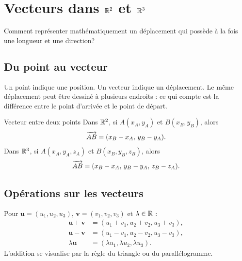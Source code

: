 \chapter{Vecteurs dans \texorpdfstring{$\mathbb{R}^2$ et $\mathbb{R}^3$}{R2 et R3}}
\label{manual:chapter:09}

\begin{questionbox}
Comment représenter mathématiquement un déplacement qui possède à la fois une longueur et une direction?
\end{questionbox}

\section{Du point au vecteur}
\label{manual:section:09.01}

\begin{intuitionbox}
Un point indique une position. Un vecteur indique un déplacement. Le même déplacement peut être dessiné à plusieurs endroits : ce qui compte est la différence entre le point d'arrivée et le point de départ.
\end{intuitionbox}

\begin{definition}{Vecteur entre deux points}{}
Dans $\mathbb{R}^2$, si $A(x_A,y_A)$ et $B(x_B,y_B)$, alors
\[
\overrightarrow{AB}=(x_B-x_A,\,y_B-y_A).
\]
Dans $\mathbb{R}^3$, si $A(x_A,y_A,z_A)$ et $B(x_B,y_B,z_B)$, alors
\[
\overrightarrow{AB}=(x_B-x_A,\,y_B-y_A,\,z_B-z_A).
\]
\end{definition}

\begin{center}
\end{center}

\section{Opérations sur les vecteurs}
\label{manual:section:09.02}

Pour $\mathbf u=(u_1,u_2,u_3)$, $\mathbf v=(v_1,v_2,v_3)$ et $\lambda\in\mathbb{R}$ :
\begin{align*}
\mathbf u+\mathbf v&=(u_1+v_1,u_2+v_2,u_3+v_3),\\
\mathbf u-\mathbf v&=(u_1-v_1,u_2-v_2,u_3-v_3),\\
\lambda\mathbf u&=(\lambda u_1,\lambda u_2,\lambda u_3).
\end{align*}
L'addition se visualise par la règle du triangle ou du parallélogramme.

